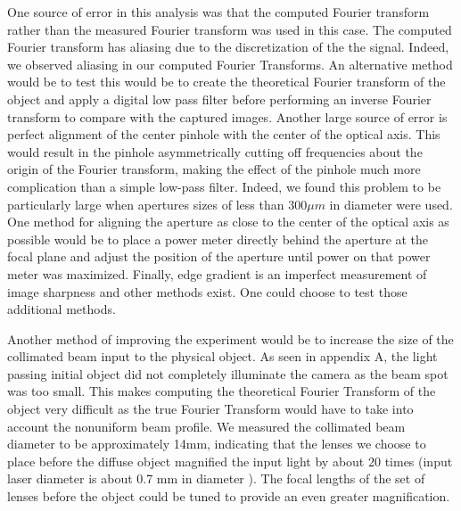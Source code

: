 \documentclass[twocolumn,amsmath,amssymb,pra]{revtex4-2}
\begin{document}
One source of error in this analysis was that the computed Fourier transform rather than the measured Fourier transform was used in this case. The computed Fourier transform has aliasing due to the discretization of the the signal. Indeed, we observed aliasing in our computed Fourier Transforms. An alternative method would be to test this would be to create the theoretical Fourier transform of the object and apply a digital low pass filter before performing an inverse Fourier transform to compare with the captured images. Another large source of error is perfect alignment of the center pinhole with the center of the optical axis. This would result in the pinhole asymmetrically cutting off frequencies about the origin of the Fourier transform, making the effect of the pinhole much more complication than a simple low-pass filter. Indeed, we found this problem to be particularly large when apertures sizes of less than $300 \mu m$ in diameter were used. One method for aligning the aperture as close to the center of the optical axis as possible would be to place a power meter directly behind the aperture at the focal plane and adjust the position of the aperture until power on that power meter was maximized. Finally, edge gradient is an imperfect measurement of image sharpness and other methods exist. One could choose to test those additional methods.  

Another method of improving the experiment would be to increase the size of the collimated beam input to the physical object. As seen in appendix A, the light passing initial object did not completely illuminate the camera as the beam spot was too small. This makes computing the theoretical Fourier Transform of the object very difficult as the true Fourier Transform would have to take into account the nonuniform beam profile. We measured the collimated beam diameter to be approximately 14mm, indicating that the lenses we choose to place before the diffuse object magnified the input light by about 20 times (input laser diameter is about 0.7 mm in diameter \cite{laser}). The focal lengths of the set of lenses before the object could be tuned to provide an even greater magnification.
\end{document}

